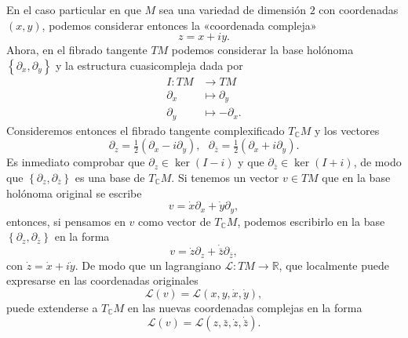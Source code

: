 \documentclass[11pt,a4paper,twoside]{article}
\theoremstyle{definition} \newtheorem{defn}[thm]{Definición}
\theoremstyle{definition} \newtheorem{ejemplo}[thm]{Ejemplo}
\theoremstyle{definition} \newtheorem{ejercicio}[thm]{Ejercicio}
\theoremstyle{remark} \newtheorem*{obs}{Observación}
\def\CC{\mathbb{C}}
\def\RR{\mathbb{R}}
\begin{document}
   En el caso particular en que $M$ sea una variedad de dimensión $2$ con coordenadas $(x,y)$, podemos considerar entonces la «coordenada compleja» 
   \begin{equation*}
     z=x+iy.
   \end{equation*}
   Ahora, en el fibrado tangente $TM$ podemos considerar la base holónoma $\left\{ \partial_x, \partial_y \right\}$ y la estructura cuasicompleja dada por
   \begin{align*}
     I :TM&\longrightarrow TM\\ 
       \partial_x &\longmapsto \partial_y \\
       \partial_y &\longmapsto -\partial_x .
     \end{align*}
     Consideremos entonces el fibrado tangente complexificado $T_{\CC}M$ y los vectores
     \begin{equation}
	 \partial_z=\tfrac{1}{2}(\partial_x-i\partial_y), \ \ \
	 \partial_{\bar{z}}=\tfrac{1}{2}(\partial_x+i\partial_y) .
     \end{equation}
     Es inmediato comprobar que 
	 $\partial_z\in \ker(I-i)$ y que
	 $\partial_{\bar{z}} \in \ker(I+i)$,
	 de modo que $\left\{ \partial_z, \partial_{\bar{z}} \right\}$ es una base de $T_{\CC}M$. Si tenemos un vector $v \in TM$ que en la base holónoma original se escribe
     \begin{equation}
       v = \dot{x} \partial_x + \dot{y} \partial_y,
     \end{equation}
     entonces, si pensamos en $v$ como vector de $T_{\CC}M$, podemos escribirlo en la base $\left\{ \partial_z, \partial_{\bar{z}} \right\}$ en la forma
     \begin{equation}
       v= \dot{z} \partial_z + \dot{\bar{z}} \partial_{\bar{z}},
     \end{equation}
     con $\dot{z}=\dot{x} + i \dot{y}$. De modo que un lagrangiano $\mathcal{L}:TM\rightarrow \RR$, que localmente puede expresarse en las coordenadas originales
     \begin{equation}
       \mathcal{L}(v)=\mathcal{L}(x,y,\dot{x},\dot{y}),
     \end{equation}
     puede extenderse a $T_{\CC}M$ en las nuevas coordenadas complejas en la forma
     \begin{equation}
       \mathcal{L} (v)=\mathcal{L}(z,\bar{z},\dot{z},\dot{\bar{z}}).
     \end{equation}
\end{document}
